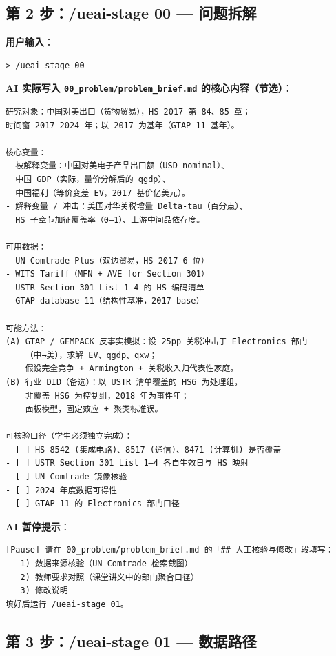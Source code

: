 \documentclass[12pt,a4paper]{article}
\begin{document}
\subsection{第 2 步：/ueai-stage 00 — 问题拆解}

\noindent\textbf{用户输入}：
\begin{lstlisting}[style=prompt]
> /ueai-stage 00
\end{lstlisting}

\noindent\textbf{AI 实际写入 \texttt{00\_problem/problem\_brief.md} 的核心内容（节选）}：
\begin{lstlisting}[style=md]
研究对象：中国对美出口（货物贸易），HS 2017 第 84、85 章；
时间窗 2017—2024 年；以 2017 为基年（GTAP 11 基年）。

核心变量：
- 被解释变量：中国对美电子产品出口额（USD nominal）、
  中国 GDP（实际，量价分解后的 qgdp）、
  中国福利（等价变差 EV，2017 基价亿美元）。
- 解释变量 / 冲击：美国对华关税增量 Delta-tau（百分点）、
  HS 子章节加征覆盖率（0–1）、上游中间品依存度。

可用数据：
- UN Comtrade Plus（双边贸易，HS 2017 6 位）
- WITS Tariff（MFN + AVE for Section 301）
- USTR Section 301 List 1–4 的 HS 编码清单
- GTAP database 11（结构性基准，2017 base）

可能方法：
(A) GTAP / GEMPACK 反事实模拟：设 25pp 关税冲击于 Electronics 部门
    （中→美），求解 EV、qgdp、qxw；
    假设完全竞争 + Armington + 关税收入归代表性家庭。
(B) 行业 DID（备选）：以 USTR 清单覆盖的 HS6 为处理组，
    非覆盖 HS6 为控制组，2018 年为事件年；
    面板模型，固定效应 + 聚类标准误。

可核验口径（学生必须独立完成）：
- [ ] HS 8542 (集成电路)、8517 (通信)、8471 (计算机) 是否覆盖
- [ ] USTR Section 301 List 1–4 各自生效日与 HS 映射
- [ ] UN Comtrade 镜像核验
- [ ] 2024 年度数据可得性
- [ ] GTAP 11 的 Electronics 部门口径
\end{lstlisting}

\noindent\textbf{AI 暂停提示}：
\begin{lstlisting}[style=shell]
[Pause] 请在 00_problem/problem_brief.md 的「## 人工核验与修改」段填写：
   1) 数据来源核验（UN Comtrade 检索截图）
   2) 教师要求对照（课堂讲义中的部门聚合口径）
   3) 修改说明
填好后运行 /ueai-stage 01。
\end{lstlisting}

\subsection{第 3 步：/ueai-stage 01 — 数据路径}
\end{document}
